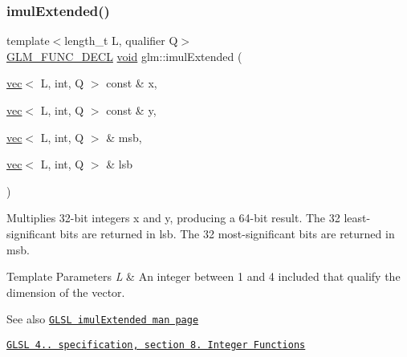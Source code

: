 \subsubsection{\texorpdfstring{imul\+Extended()}{imulExtended()}}
{\footnotesize\ttfamily template$<$length\+\_\+t L, qualifier Q$>$ \\
\mbox{\hyperlink{setup_8hpp_ab2d052de21a70539923e9bcbf6e83a51}{G\+L\+M\+\_\+\+F\+U\+N\+C\+\_\+\+D\+E\+CL}} \mbox{\hyperlink{_s_d_l__opengles2__gl2ext_8h_ae5d8fa23ad07c48bb609509eae494c95}{void}} glm\+::imul\+Extended (\begin{DoxyParamCaption}\item[{\mbox{\hyperlink{structglm_1_1vec}{vec}}$<$ L, int, Q $>$ const \&}]{x,  }\item[{\mbox{\hyperlink{structglm_1_1vec}{vec}}$<$ L, int, Q $>$ const \&}]{y,  }\item[{\mbox{\hyperlink{structglm_1_1vec}{vec}}$<$ L, int, Q $>$ \&}]{msb,  }\item[{\mbox{\hyperlink{structglm_1_1vec}{vec}}$<$ L, int, Q $>$ \&}]{lsb }\end{DoxyParamCaption})}

Multiplies 32-\/bit integers x and y, producing a 64-\/bit result. The 32 least-\/significant bits are returned in lsb. The 32 most-\/significant bits are returned in msb.


\begin{DoxyTemplParams}{Template Parameters}
{\em L} & An integer between 1 and 4 included that qualify the dimension of the vector.\\
\hline
\end{DoxyTemplParams}
\begin{DoxySeeAlso}{See also}
\href{http://www.opengl.org/sdk/docs/manglsl/xhtml/imulExtended.xml}{\tt G\+L\+SL imul\+Extended man page} 

\href{http://www.opengl.org/registry/doc/GLSLangSpec.4.20.8.pdf}{\tt G\+L\+SL 4.. specification, section 8. Integer Functions} 
\end{DoxySeeAlso}
\mbox{\label{group__core__func__integer_gaedcec48743632dff6786bcc492074b1b}} 
